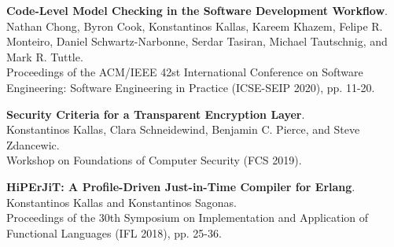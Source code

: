 \begin{minipage}{\textwidth}
\textbf{Code-Level Model Checking in the Software Development Workflow}. \\
Nathan Chong, Byron Cook, Konstantinos Kallas, Kareem Khazem, Felipe R. Monteiro, Daniel Schwartz-Narbonne, Serdar Tasiran, Michael Tautschnig, and Mark R. Tuttle. \\
Proceedings of the ACM/IEEE 42st International Conference on Software Engineering: Software Engineering in Practice (ICSE-SEIP 2020), pp. 11-20.
\end{minipage}

\begin{minipage}{\textwidth}
\textbf{Security Criteria for a Transparent Encryption Layer}. \\
Konstantinos Kallas, Clara Schneidewind, Benjamin C. Pierce, and Steve Zdancewic. \\
Workshop on Foundations of Computer Security (FCS 2019).
\end{minipage}

\begin{minipage}{\textwidth}
\textbf{HiPErJiT: A Profile-Driven Just-in-Time Compiler for Erlang}. \\
Konstantinos Kallas and Konstantinos Sagonas. \\
Proceedings of the 30th Symposium on Implementation and Application of Functional Languages (IFL 2018), pp. 25-36.
\end{minipage}


